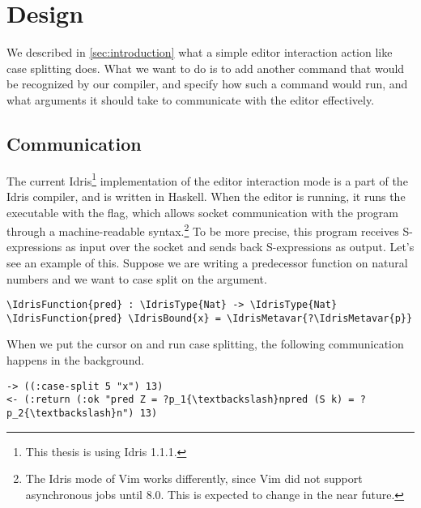 \section{Design}\label{sec:design}



We described in \autoref{sec:introduction} what a simple editor interaction
action like case splitting does.  What we want to do is to add another command
that would be recognized by our compiler, and specify how such a command would
run, and what arguments it should take to communicate with the editor
effectively.

\subsection{Communication}\label{ssec:communication}

The current Idris\footnote{This thesis is using Idris 1.1.1.} implementation of
the editor interaction mode is a part of the Idris compiler, and is written in
Haskell. When the editor is running,
it runs the  executable with the  flag, which
allows socket communication with the program through a machine-readable
syntax.\footnote{The Idris mode of Vim works differently, since Vim did not
support asynchronous jobs until 8.0. This is expected to change in the near
future.}
To be more precise, this program receives S-expressions\cite{mccarthy} as input
over the socket and sends back S-expressions as output. Let's see an example of
this. Suppose we are writing a predecessor function on natural numbers and we
want to case split on the argument.

\begin{Verbatim}[framesep=2mm, label=\footnotesize{\normalfont{Idris}}, labelposition=topline]
\IdrisFunction{pred} : \IdrisType{Nat} -> \IdrisType{Nat}
\IdrisFunction{pred} \IdrisBound{x} = \IdrisMetavar{?\IdrisMetavar{p}}
\end{Verbatim}

When we put the cursor on  and run case splitting, the following
communication happens in the background.

\begin{Verbatim}[framesep=2mm, label=\footnotesize{\normalfont{S-expression}}, labelposition=topline]
-> ((:case-split 5 "x") 13)
<- (:return (:ok "pred Z = ?p_1{\textbackslash}npred (S k) = ?p_2{\textbackslash}n") 13)
\end{Verbatim}

